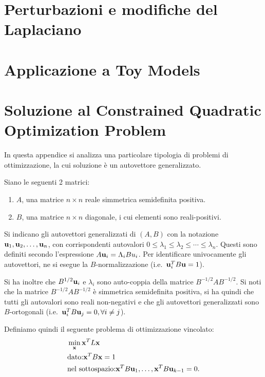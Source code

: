 \documentclass[10pt,a4paper]{article}
\begin{document}
\section{Perturbazioni e modifiche del Laplaciano}\label{sec:perturbazioni}

\section{Applicazione a Toy Models}\label{sec:applicazione}

\appendix
\section{Soluzione al Constrained Quadratic Optimization Problem}\label{sec:soluzione_constrained}
In questa appendice si analizza una particolare tipologia di problemi di ottimizzazione, la cui soluzione è un autovettore generalizzato.

Siano le seguenti 2 matrici:
\begin{enumerate}
    \item \(A\), una matrice \(n \times n\) reale simmetrica semidefinita positiva.
    \item \(B\), una matrice \(n \times n\) diagonale, i cui elementi sono reali-positivi.
\end{enumerate}
Si indicano gli autovettori generalizzati di \((A,B)\) con la notazione \(\vb{u}_1,\vb{u}_2,\ldots,\vb{u}_n\), con corrispondenti autovalori \(0\leq\lambda_1\leq\lambda_2\leq\cdots\leq\lambda_n\).
Questi sono definiti secondo l'espressione \(A \vb{u}_i = \Lambda_i B u_i\).
Per identificare univocamente gli autovettori, ne si esegue la \(B\)-normalizzazione (i.e.\  \(\vb{u}_i^T B \vb{u}=1\)).

Si ha inoltre che \(B^{1/2}\vb{u}_i\) e \(\lambda_i\) sono auto-coppia della matrice \(B^{-1/2} A B^{-1/2}\).
Si noti che la matrice \(B^{-1/2} A B^{-1/2}\) è simmetrica semidefinita positiva, si ha quindi che tutti gli autovalori sono reali non-negativi e che gli autovettori generalizzati sono \(B\)-ortogonali (i.e.\  \(\vb{u}_i^T B \vb{u}_j = 0, \forall i \neq j\)).

Definiamo quindi il seguente problema di ottimizzazione vincolato:
\begin{align}
    & \min_{\vb{x}} \vb{x}^T L\vb{x} \label{eq:definition}\\
    & \text{dato:} \vb{x}^T B\vb{x} = 1 \\
    & \text{nel sottospazio:} \vb{x}^T B \vb{u}_1,\ldots, \vb{x}^T B \vb{u}_{k-1} = 0.
\end{align}
\end{document}
